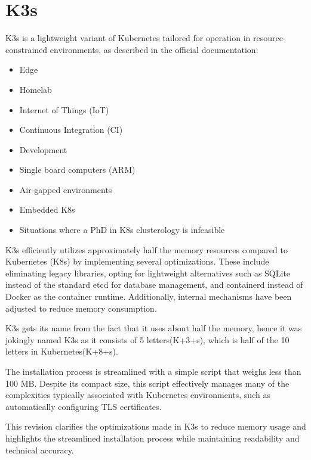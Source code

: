 \section{K3s}
K3s is a lightweight variant of Kubernetes tailored for operation in resource-constrained environments,  as described in the official documentation\cite{k2-1}:
\begin{itemize}
\item Edge
\item Homelab
\item Internet of Things (IoT)
\item Continuous Integration (CI)
\item Development
\item Single board computers (ARM)
\item Air-gapped environments
\item Embedded K8s
\item Situations where a PhD in K8s clusterology is infeasible
\end{itemize}
K3s efficiently utilizes approximately half the memory resources compared to Kubernetes (K8s) by implementing several optimizations. These include eliminating legacy libraries, opting for lightweight alternatives such as SQLite instead of the standard etcd for database management, and containerd instead of Docker as the container runtime. Additionally, internal mechanisms have been adjusted to reduce memory consumption.

K3s gets its name from the fact that it uses about half the memory, hence it was jokingly named K3s as it consists of 5 letters(K+3+s), which is half of the 10 letters in Kubernetes(K+8+s).

The installation process is streamlined with a simple script that weighs less than 100 MB. Despite its compact size, this script effectively manages many of the complexities typically associated with Kubernetes environments, such as automatically configuring TLS certificates.

This revision clarifies the optimizations made in K3s to reduce memory usage and highlights the streamlined installation process while maintaining readability and technical accuracy.


